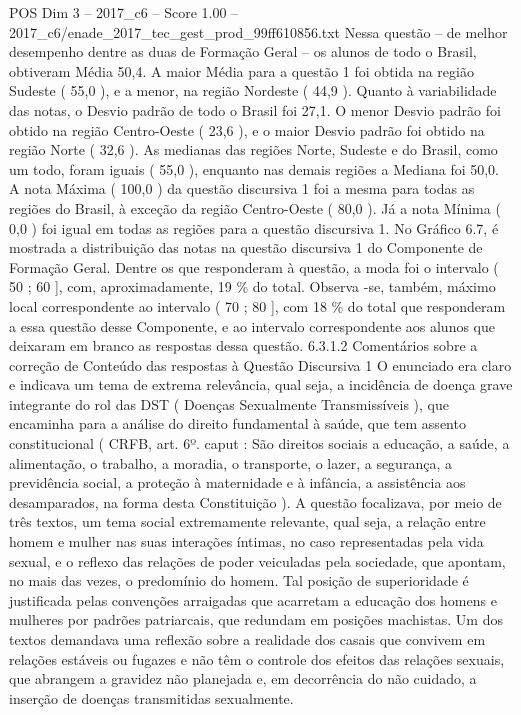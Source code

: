 \begin{textsample}{POS Dim 3 – 2017\_c6 – Score 1.00 – 2017\_c6/enade\_2017\_tec\_gest\_prod\_99ff610856.txt}
Nessa questão – de melhor desempenho dentre as duas de Formação Geral – os alunos de todo o Brasil, obtiveram Média 50,4.
A maior Média para a questão 1 foi obtida na região Sudeste ( 55,0 ), e a menor, na região Nordeste ( 44,9 ).
Quanto à variabilidade das notas, o Desvio padrão de todo o Brasil foi 27,1.
O menor Desvio padrão foi obtido na região Centro-Oeste ( 23,6 ), e o maior Desvio padrão foi obtido na região Norte ( 32,6 ).
As medianas das regiões Norte, Sudeste e do Brasil, como um todo, foram iguais ( 55,0 ), enquanto nas demais regiões a Mediana foi 50,0.
A nota Máxima ( 100,0 ) da questão discursiva 1 foi a mesma para todas as regiões do Brasil, à exceção da região Centro-Oeste ( 80,0 ).
Já a nota Mínima ( 0,0 ) foi igual em todas as regiões para a questão discursiva 1.
No Gráfico 6.7, é mostrada a distribuição das notas na questão discursiva 1 do Componente de Formação Geral.
Dentre os que responderam à questão, a moda foi o intervalo ( 50 ; 60 ], com, aproximadamente, 19 \% do total.
Observa -se, também, máximo local correspondente ao intervalo ( 70 ; 80 ], com 18 \% do total que responderam a essa questão desse Componente, e ao intervalo correspondente aos alunos que deixaram em branco as respostas dessa questão. 6.3.1.2 Comentários sobre a correção de Conteúdo das respostas à Questão Discursiva 1 O enunciado era claro e indicava um tema de extrema relevância, qual seja, a incidência de doença grave integrante do rol das DST ( Doenças Sexualmente Transmissíveis ), que encaminha para a análise do direito fundamental à saúde, que tem assento constitucional ( CRFB, art. 6º. caput : São direitos sociais a educação, a saúde, a alimentação, o trabalho, a moradia, o transporte, o lazer, a segurança, a previdência social, a proteção à maternidade e à infância, a assistência aos desamparados, na forma desta Constituição ).
A questão focalizava, por meio de três textos, um tema social extremamente relevante, qual seja, a relação entre homem e mulher nas suas interações íntimas, no caso representadas pela vida sexual, e o reflexo das relações de poder veiculadas pela sociedade, que apontam, no mais das vezes, o predomínio do homem.
Tal posição de superioridade é justificada pelas convenções arraigadas que acarretam a educação dos homens e mulheres por padrões patriarcais, que redundam em posições machistas.
Um dos textos demandava uma reflexão sobre a realidade dos casais que convivem em relações estáveis ou fugazes e não têm o controle dos efeitos das relações sexuais, que abrangem a gravidez não planejada e, em decorrência do não cuidado, a inserção de doenças transmitidas sexualmente.

\end{textsample}
